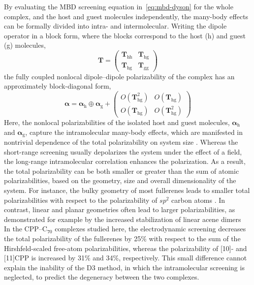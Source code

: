 By evaluating the MBD screening equation in~\eqref{eq:mbd-dyson} for the whole complex, and the host and guest molecules independently, the many-body effects can be formally divided into intra- and intermolecular.
Writing the dipole operator in a block form, where the blocks correspond to the host (h) and guest (g) molecules,
\begin{equation}
  \mathbf T=\begin{pmatrix}\mathbf T_\text{hh} & \mathbf T_\text{hg} \\\mathbf T_\text{hg} & \mathbf T_\text{gg}\end{pmatrix}
\end{equation}
the fully coupled nonlocal dipole--dipole polarizability of the complex has an approximately block-diagonal form,
\begin{equation}
  \boldsymbol\alpha=\boldsymbol\alpha_\text{h}\oplus\boldsymbol\alpha_\text{g}+
  \begin{pmatrix}O(\mathbf T_\text{hg}^2) & O(\mathbf T_\text{hg}) \\O(\mathbf T_\text{hg}) & O(\mathbf T_\text{hg}^2)\end{pmatrix}
\end{equation}
Here, the nonlocal polarizabilities of the isolated host and guest molecules, $\boldsymbol\alpha_\text{h}$ and $\boldsymbol\alpha_\text{g}$, capture the intramolecular many-body effects, which are manifested in nontrivial dependence of the total polarizability on system size \citep{GobreNC13,RuzsinszkyPRL12}.
Whereas the short-range screening usually depolarizes the system under the effect of a field, the long-range intramolecular correlation enhances the polarization.
As a result, the total polarizability can be both smaller or greater than the sum of atomic polarizabilities, based on the geometry, size and overall dimensionality of the system.
For instance, the bulky geometry of most fullerenes leads to smaller total polarizabilities with respect to the polarizability of $sp^2$ carbon atoms \citep{TkatchenkoPRL12}.
In contrast, linear and planar geometries often lead to larger polarizabilities, as demonstrated for example by the increased stabilization of linear acene dimers~\cite{GrimmeACIE08,EhrlichACR13}
In the CPP--C$_{70}$ complexes studied here, the electrodynamic screening decreases the total polarizability of the fullerenes by 25\% with respect to the sum of the Hirshfeld-scaled free-atom polarizabilities, whereas the polarizability of [10]- and [11]CPP is increased by 31\% and 34\%, respectively.
This small difference cannot explain the inability of the D3 method, in which the intramolecular screening is neglected, to predict the degeneracy between the two complexes.

